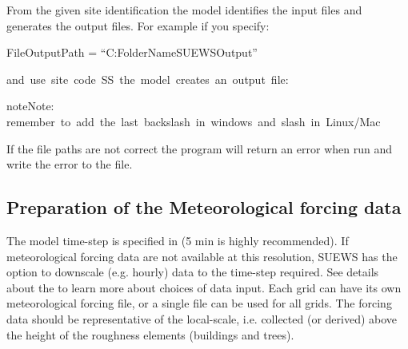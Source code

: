 \documentclass[letterpaper,10pt,english]{sphinxmanual}
\begin{document}
From the given site identification the model identifies the input files
and generates the output files. For example if you specify:

%
\begin{sphinxVerbatim}[commandchars=\\\{\}]
FileOutputPath = “C:\PYGZbs{}FolderName\PYGZbs{}SUEWSOutput\PYGZbs{}”
\end{sphinxVerbatim}

and use site code SS the model creates an output file:

%
\begin{sphinxVerbatim}[commandchars=\\\{\}]
\PYGZbs{}\PYGZbs{}\PYGZbs{}
\end{sphinxVerbatim}

\begin{sphinxadmonition}{note}{Note:}
remember to add the last backslash in windows and slash in Linux/Mac
\end{sphinxadmonition}

If the file paths are not correct the program will return an error when
run and write the error to the {\hyperref[\detokenize{output_files/output_files:problems-txt}]{}} file.


\subsection{Preparation of the Meteorological forcing data}
\label{\detokenize{prepare-to-run-the-model:preparation-of-the-meteorological-forcing-data}}
The model time-step is specified in {\hyperref[\detokenize{input_files/RunControl/RunControl:runcontrol-nml}]{}}
(5 min is highly recommended). If meteorological forcing data are not
available at this resolution, SUEWS has the option to downscale (e.g.
hourly) data to the time-step required. See details about the
{\hyperref[\detokenize{input_files/met_input:ssss-yyyy-data-tt-txt}]{}} to learn more
about choices of data input. Each grid can have its own meteorological
forcing file, or a single file can be used for all grids. The forcing
data should be representative of the local-scale, i.e. collected (or
derived) above the height of the roughness elements (buildings and
trees).
\end{document}
